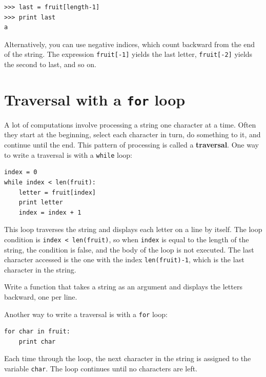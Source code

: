 \documentclass[10pt]{book}
\begin{document}
\begin{CJK}{UTF8}{gbsn}
\begin{verbatim}
>>> last = fruit[length-1]
>>> print last
a
\end{verbatim}
%
Alternatively, you can use negative indices, which count backward from
the end of the string.  The expression {\tt fruit[-1]} yields the last
letter, {\tt fruit[-2]} yields the second to last, and so on.


\section{Traversal with a {\tt for} loop}
\label{for}

A lot of computations involve processing a string one character at a
time.  Often they start at the beginning, select each character in
turn, do something to it, and continue until the end.  This pattern of
processing is called a {\bf traversal}.  One way to write a traversal
is with a {\tt while} loop:

\begin{verbatim}
index = 0
while index < len(fruit):
    letter = fruit[index]
    print letter
    index = index + 1
\end{verbatim}
%
This loop traverses the string and displays each letter on a line by
itself.  The loop condition is {\tt index < len(fruit)}, so
when {\tt index} is equal to the length of the string, the
condition is false, and the body of the loop is not executed.  The
last character accessed is the one with the index {\tt len(fruit)-1},
which is the last character in the string.

\begin{exercise}

Write a function that takes a string as an argument
and displays the letters backward, one per line.

\end{exercise}

Another way to write a traversal is with a {\tt for} loop:

\begin{verbatim}
for char in fruit:
    print char
\end{verbatim}
%
Each time through the loop, the next character in the string is assigned
to the variable {\tt char}.  The loop continues until no characters are
left.


\end{CJK}
\end{document}
